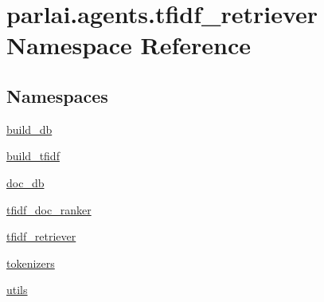 \hypertarget{namespaceparlai_1_1agents_1_1tfidf__retriever}{}\section{parlai.\+agents.\+tfidf\+\_\+retriever Namespace Reference}
\label{namespaceparlai_1_1agents_1_1tfidf__retriever}
\subsection*{Namespaces}
\begin{DoxyCompactItemize}
\item 
 \hyperlink{namespaceparlai_1_1agents_1_1tfidf__retriever_1_1build__db}{build\+\_\+db}
\item 
 \hyperlink{namespaceparlai_1_1agents_1_1tfidf__retriever_1_1build__tfidf}{build\+\_\+tfidf}
\item 
 \hyperlink{namespaceparlai_1_1agents_1_1tfidf__retriever_1_1doc__db}{doc\+\_\+db}
\item 
 \hyperlink{namespaceparlai_1_1agents_1_1tfidf__retriever_1_1tfidf__doc__ranker}{tfidf\+\_\+doc\+\_\+ranker}
\item 
 \hyperlink{namespaceparlai_1_1agents_1_1tfidf__retriever_1_1tfidf__retriever}{tfidf\+\_\+retriever}
\item 
 \hyperlink{namespaceparlai_1_1agents_1_1tfidf__retriever_1_1tokenizers}{tokenizers}
\item 
 \hyperlink{namespaceparlai_1_1agents_1_1tfidf__retriever_1_1utils}{utils}
\end{DoxyCompactItemize}
